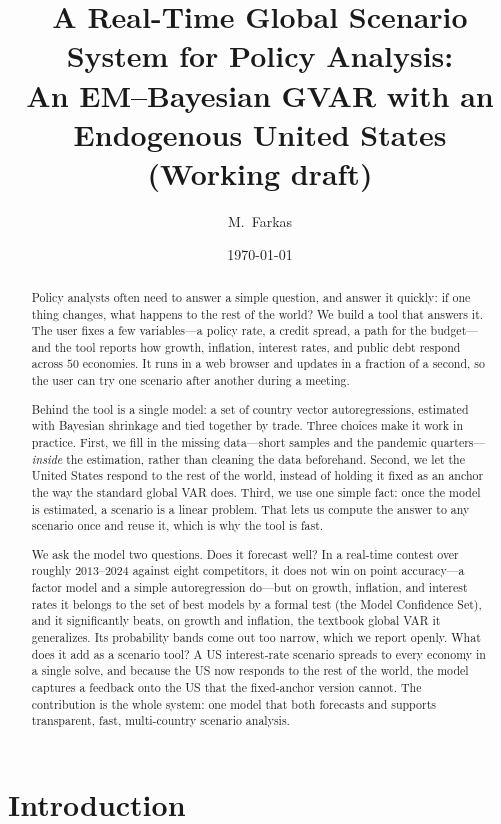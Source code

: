 \documentclass[11pt]{article}
\title{\textbf{A Real-Time Global Scenario System for Policy Analysis:\\
An EM--Bayesian GVAR with an Endogenous United States}\\[4pt]
\large{(Working draft)}}
\author{M.\ Farkas}
\date{\today}
\begin{document}
\maketitle

\begin{abstract}
\noindent Policy analysts often need to answer a simple question, and answer it quickly: if one thing
changes, what happens to the rest of the world? We build a tool that answers it. The user fixes a few
variables---a policy rate, a credit spread, a path for the budget---and the tool reports how growth,
inflation, interest rates, and public debt respond across $50$ economies. It runs in a web browser and
updates in a fraction of a second, so the user can try one scenario after another during a meeting.

Behind the tool is a single model: a set of country vector autoregressions, estimated with Bayesian
shrinkage and tied together by trade. Three choices make it work in practice. First, we fill in the
missing data---short samples and the pandemic quarters---\emph{inside} the estimation, rather than
cleaning the data beforehand. Second, we let the United States respond to the rest of the world, instead
of holding it fixed as an anchor the way the standard global VAR does. Third, we use one simple fact:
once the model is estimated, a scenario is a linear problem. That lets us compute the answer to any
scenario once and reuse it, which is why the tool is fast.

We ask the model two questions. Does it forecast well? In a real-time contest over roughly $2013$--$2024$
against eight competitors, it does not win on point accuracy---a factor model and a simple autoregression
do---but on growth, inflation, and interest rates it belongs to the set of best models by a formal test
(the Model Confidence Set), and it significantly beats, on growth and inflation, the textbook global VAR it
generalizes. Its probability bands come out too narrow, which we report openly. What does it add as a
scenario tool? A US interest-rate scenario spreads to every economy in a single solve, and because the US
now responds to the rest of the world, the model captures a feedback onto the US that the fixed-anchor
version cannot. The contribution is the whole system: one model that both forecasts and supports
transparent, fast, multi-country scenario analysis.
\end{abstract}

\section{Introduction}
\end{document}
